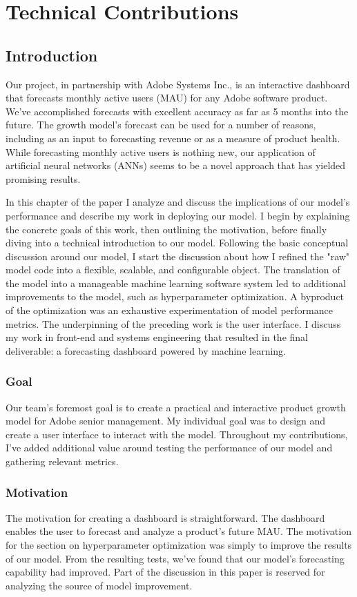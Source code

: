 \documentclass[11pt, oneside, authoryear]{report}
\begin{document}
\chapter{Technical Contributions}

\section{Introduction}
Our project, in partnership with Adobe Systems Inc., is an interactive dashboard that forecasts monthly active users (MAU) for any Adobe software product. We've accomplished forecasts with excellent accuracy as far as 5 months into the future. The growth model's forecast can be used for a number of reasons, including as an input to forecasting revenue or as a measure of product health. While forecasting monthly active users is nothing new, our application of artificial neural networks (ANNs) seems to be a novel approach that has yielded promising results.

In this chapter of the paper I analyze and discuss the implications of our model's performance and describe my work in deploying our model. I begin by explaining the concrete goals of this work, then outlining the motivation, before finally diving into a technical introduction to our model. Following the basic conceptual discussion around our model, I start the discussion about how I refined the "raw" model code into a flexible, scalable, and configurable object. The translation of the model into a manageable machine learning software system led to additional improvements to the model, such as hyperparameter optimization. A byproduct of the optimization was an exhaustive experimentation of model performance metrics. The underpinning of the preceding work is the user interface. I discuss my work in front-end and systems engineering that resulted in the final deliverable: a forecasting dashboard powered by machine learning.

\subsection{Goal}
Our team's foremost goal is to create a practical and interactive product growth model for Adobe senior management. My individual goal was to design and create a user interface to interact with the model. Throughout my contributions, I've added additional value around testing the performance of our model and gathering relevant metrics.

\subsection{Motivation}
The motivation for creating a dashboard is straightforward. The dashboard enables the user to forecast and analyze a product's future MAU.
The motivation for the section on hyperparameter optimization was simply to improve the results of our model. From the resulting tests, we've found that our model's forecasting capability had improved. Part of the discussion in this paper is reserved for analyzing the source of model improvement.
\end{document}
